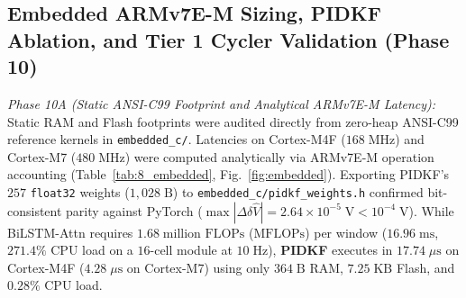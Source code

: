 \documentclass[10pt,a4paper]{article}
\providecommand{\upmu}{\mu}
\begin{document}
\subsection{Embedded ARMv7E-M Sizing, PIDKF Ablation, and Tier 1 Cycler Validation (Phase 10)\label{sec:hw_profiling}}
\emph{Phase 10A (Static ANSI-C99 Footprint and Analytical ARMv7E-M Latency):} Static RAM and Flash footprints were audited directly from zero-heap ANSI-C99 reference kernels in \texttt{embedded\_c/}. Latencies on Cortex-M4F ($168\;\mathrm{MHz}$) and Cortex-M7 ($480\;\mathrm{MHz}$) were computed analytically via ARMv7E-M operation accounting (Table~\ref{tab:8_embedded}, Fig.~\ref{fig:embedded}). Exporting PIDKF's $257$ \texttt{float32} weights ($1,028\;\mathrm{B}$) to \texttt{embedded\_c/\allowbreak pidkf\_weights.h} confirmed bit-consistent parity against PyTorch ($\max|\Delta\delta\hat{V}| = 2.64\times 10^{-5}\;\mathrm{V} < 10^{-4}\;\mathrm{V}$). While BiLSTM-Attn requires $1.68\;\text{million FLOPs}$ ($\text{MFLOPs}$) per window ($16.96\;\mathrm{ms}$, $271.4\%$ CPU load on a $16$-cell module at $10\;\mathrm{Hz}$), \textbf{PIDKF} executes in $17.74\;\upmu\mathrm{s}$ on Cortex-M4F ($4.28\;\upmu\mathrm{s}$ on Cortex-M7) using only $364\;\mathrm{B}$ RAM, $7.25\;\mathrm{KB}$ Flash, and $0.28\%$ CPU load.
\end{document}
